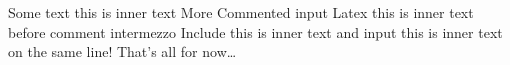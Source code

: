 Some text
this is
inner
text
More
Commented input %
Latex
this is
inner
text
 before comment %
intermezzo
Include 
this is
inner
text
 and input 
this is
inner
text
 on the same line! %
That's all for now\ldots
